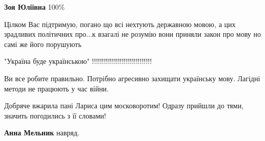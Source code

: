 \begin{itemize}
\begin{itemize}
\textbf{Зоя Юліївна} 100\%
 
\end{itemize}

 

Цілком Вас підтримую, погано що всі нехтують державною мовою, а цих зрадливих
політичних про...к взагалі не розумію вони приняли закон про мову но самі же його
порушують


 

"Україна буде українською" !!!!!!!!!!!!!!!!!!!!!!!!!!!!!!


 
Ви все робите правильно. Потрібно агресивно захищати українську мову. Лагідні
методи не працюють у час війни.


 

Добряче вжарила пані Лариса цим московоротим! Одразу прийшли до тями, значить погодились з її словами!

\begin{itemize}
 
\textbf{Анна Мельник} навряд.
\end{itemize}

 


\end{itemize}

